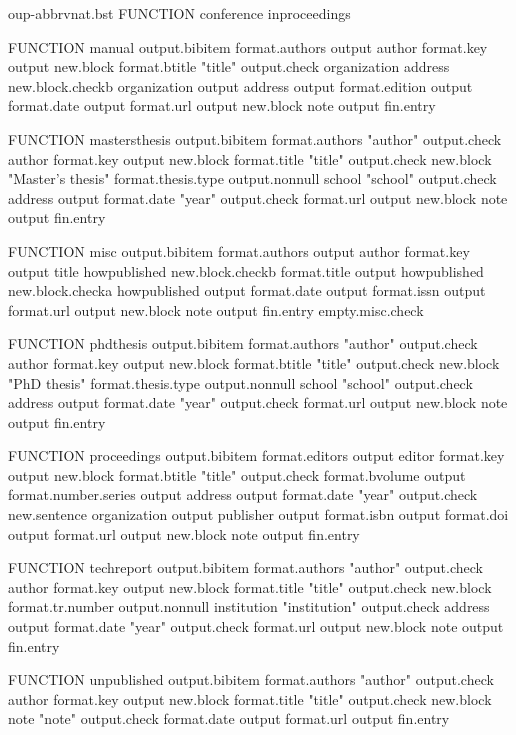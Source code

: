 \begin{filecontents*}[overwrite]{oup-abbrvnat.bst}
FUNCTION {conference} { inproceedings }

FUNCTION {manual}
{ output.bibitem
  format.authors output
  author format.key output
  new.block
  format.btitle "title" output.check
  organization address new.block.checkb
  organization output
  address output
  format.edition output
  format.date output
  format.url output
  new.block
  note output
  fin.entry
}

FUNCTION {mastersthesis}
{ output.bibitem
  format.authors "author" output.check
  author format.key output
  new.block
  format.title "title" output.check
  new.block
  "Master's thesis" format.thesis.type output.nonnull
  school "school" output.check
  address output
  format.date "year" output.check
  format.url output
  new.block
  note output
  fin.entry
}

FUNCTION {misc}
{ output.bibitem
  format.authors output
  author format.key output
  title howpublished new.block.checkb
  format.title output
  howpublished new.block.checka
  howpublished output
  format.date output
  format.issn output
  format.url output
  new.block
  note output
  fin.entry
  empty.misc.check
}

FUNCTION {phdthesis}
{ output.bibitem
  format.authors "author" output.check
  author format.key output
  new.block
  format.btitle "title" output.check
  new.block
  "PhD thesis" format.thesis.type output.nonnull
  school "school" output.check
  address output
  format.date "year" output.check
  format.url output
  new.block
  note output
  fin.entry
}

FUNCTION {proceedings}
{ output.bibitem
  format.editors output
  editor format.key output
  new.block
  format.btitle "title" output.check
  format.bvolume output
  format.number.series output
  address output
  format.date "year" output.check
  new.sentence
  organization output
  publisher output
  format.isbn output
  format.doi output
  format.url output
  new.block
  note output
  fin.entry
}

FUNCTION {techreport}
{ output.bibitem
  format.authors "author" output.check
  author format.key output
  new.block
  format.title "title" output.check
  new.block
  format.tr.number output.nonnull
  institution "institution" output.check
  address output
  format.date "year" output.check
  format.url output
  new.block
  note output
  fin.entry
}

FUNCTION {unpublished}
{ output.bibitem
  format.authors "author" output.check
  author format.key output
  new.block
  format.title "title" output.check
  new.block
  note "note" output.check
  format.date output
  format.url output
  fin.entry
}


\end{filecontents*}
